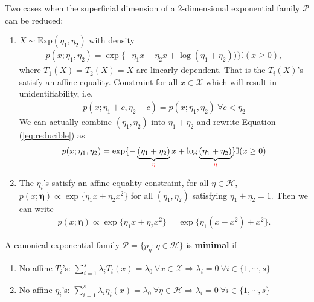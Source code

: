 \begin{note}
    Two cases when the superficial dimension of a 2-dimensional exponential family $\mathcal{P}$ can be reduced:
    \begin{enumerate}[{(1)}]
        \item $X\sim\text{Exp}(\eta_1,\eta_2)$ with density
        \begin{gather}
            p(x;\eta_1,\eta_2)=\exp\{-\eta_1x-\eta_2x+\log(\eta_1+\eta_2))\}\mathbb{I}(x\geq 0),\label{eq:reducible}
        \end{gather}
        where $T_1(X)=T_2(X)=X$ are linearly dependent. 
        That is the $T_i(X)$'s satisfy an affine equality. 
        Constraint for all $x\in\mathcal{X}$ which will result in unidentifiability, i.e.
        \begin{gather}
            p(x;\eta_1+c,\eta_2-c)=p(x;\eta_1,\eta_2)~\forall{c}<\eta_2
        \end{gather}
        We can actually combine $(\eta_1,\eta_2)$ into $\eta_1+\eta_2$ and rewrite Equation (\ref{eq:reducible}) as 
        \begin{gather}
            p(x;\eta_1,\eta_2)=\exp\{-\underbrace{(\eta_1+\eta_2)}_{\color{red}\eta}x
            +\log\underbrace{(\eta_1+\eta_2)}_{\color{red} \eta}\}\mathbb{I}(x\geq 0)
        \end{gather}
        \item The $\eta_i$'s satisfy an affine equality constraint, for all $\eta\in\mathcal{H}$,
        $p(x;\boldsymbol{\eta})\propto\exp\{\eta_1x+\eta_2x^2\}$ for all $(\eta_1,\eta_2)$ 
        satisfying $\eta_1+\eta_2=1$. 
        Then we can write 
        \begin{gather}
            p(x;\boldsymbol{\eta})\propto\exp\{\eta_1x+\eta_2x^2\}=\exp\{\eta_1(x-x^2)+x^2\}.
        \end{gather}
    \end{enumerate}
\end{note}

\begin{definition}[Minimal]
    A canonical exponential family $\mathcal{P}=\{p_\eta:\eta\in\mathcal{H}\}$ is \textbf{\uline{minimal}} if
    \begin{enumerate}[{(1)}]
        \item No affine $T_i$'s: 
        $\sum_{i=1}^s\lambda_iT_i(x)=\lambda_0~\forall{x}\in\mathcal{X}\Rightarrow\lambda_i=0~\forall{i}\in\{1,\cdots,s\}$
        \item No affine $\eta_i$'s: 
        $\sum_{i=1}^s\lambda_i\eta_i(x)=\lambda_0~\forall{\eta}\in\mathcal{H}\Rightarrow\lambda_i=0~\forall{i}\in\{1,\cdots,s\}$
    \end{enumerate}
\end{definition}

